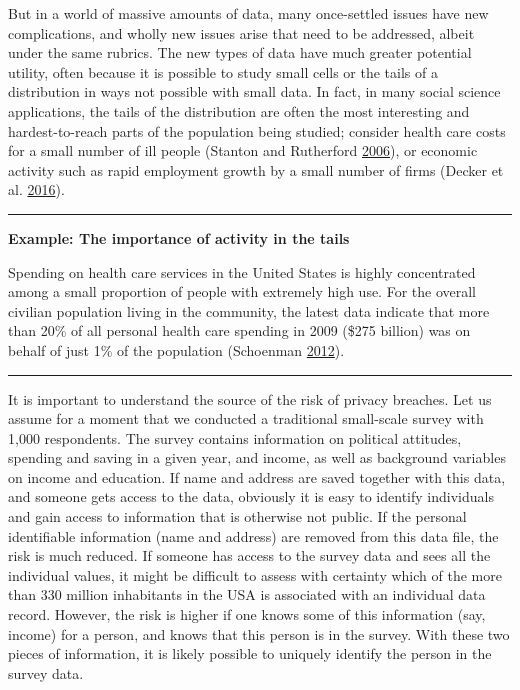 \documentclass[]{krantz}
\begin{document}
But in a world of massive amounts of data, many once-settled issues have
new complications, and wholly new issues arise that need to be
addressed, albeit under the same rubrics. The new types of data have
much greater potential utility, often because it is possible to study
small cells or the tails of a distribution in ways not possible with
small data. In fact, in many social science applications, the tails of
the distribution are often the most interesting and hardest-to-reach
parts of the population being studied; consider health care costs for a
small number of ill people (Stanton and Rutherford
\protect\hyperlink{ref-stanton2006high}{2006}), or economic activity
such as rapid employment growth by a small number of firms (Decker et
al. \protect\hyperlink{ref-decker2015has}{2016}).

\begin{center}\rule{0.5\linewidth}{\linethickness}\end{center}

\textbf{Example: The importance of activity in the tails}

Spending on health care services in the United States is highly
concentrated among a small proportion of people with extremely high use.
For the overall civilian population living in the community, the latest
data indicate that more than 20\% of all personal health care spending
in 2009 (\$275 billion) was on behalf of just 1\% of the population
(Schoenman \protect\hyperlink{ref-healthcarespending}{2012}).

\begin{center}\rule{0.5\linewidth}{\linethickness}\end{center}

It is important to understand the source of the risk of privacy
breaches. Let us assume for a moment that we conducted a traditional
small-scale survey with 1,000 respondents. The survey contains
information on political attitudes, spending and saving in a given year,
and income, as well as background variables on income and education. If
name and address are saved together with this data, and someone gets
access to the data, obviously it is easy to identify individuals and
gain access to information that is otherwise not public. If the personal
identifiable information (name and address) are removed from this data
file, the risk is much reduced. If someone has access to the survey data
and sees all the individual values, it might be difficult to assess with
certainty which of the more than 330 million inhabitants in the USA is
associated with an individual data record. However, the risk is higher
if one knows some of this information (say, income) for a person, and
knows that this person is in the survey. With these two pieces of
information, it is likely possible to uniquely identify the person in
the survey data.
\end{document}
